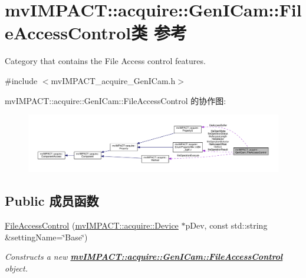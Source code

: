 \hypertarget{classmv_i_m_p_a_c_t_1_1acquire_1_1_gen_i_cam_1_1_file_access_control}{\section{mv\+I\+M\+P\+A\+C\+T\+:\+:acquire\+:\+:Gen\+I\+Cam\+:\+:File\+Access\+Control类 参考}
\label{classmv_i_m_p_a_c_t_1_1acquire_1_1_gen_i_cam_1_1_file_access_control}
}


Category that contains the File Access control features.  




{\ttfamily \#include $<$mv\+I\+M\+P\+A\+C\+T\+\_\+acquire\+\_\+\+Gen\+I\+Cam.\+h$>$}



mv\+I\+M\+P\+A\+C\+T\+:\+:acquire\+:\+:Gen\+I\+Cam\+:\+:File\+Access\+Control 的协作图\+:
\nopagebreak
\begin{figure}[H]
\begin{center}
\leavevmode
\includegraphics[width=350pt]{classmv_i_m_p_a_c_t_1_1acquire_1_1_gen_i_cam_1_1_file_access_control__coll__graph}
\end{center}
\end{figure}
\subsection*{Public 成员函数}
\begin{DoxyCompactItemize}
\item 
\hyperlink{classmv_i_m_p_a_c_t_1_1acquire_1_1_gen_i_cam_1_1_file_access_control_abb7557bf51da54023072c0cf2ca4d2ce}{File\+Access\+Control} (\hyperlink{classmv_i_m_p_a_c_t_1_1acquire_1_1_device}{mv\+I\+M\+P\+A\+C\+T\+::acquire\+::\+Device} $\ast$p\+Dev, const std\+::string \&setting\+Name=\char`\"{}Base\char`\"{})
\begin{DoxyCompactList}\small\item\em Constructs a new {\bfseries \hyperlink{classmv_i_m_p_a_c_t_1_1acquire_1_1_gen_i_cam_1_1_file_access_control}{mv\+I\+M\+P\+A\+C\+T\+::acquire\+::\+Gen\+I\+Cam\+::\+File\+Access\+Control}} object. \end{DoxyCompactList}\end{DoxyCompactItemize}
